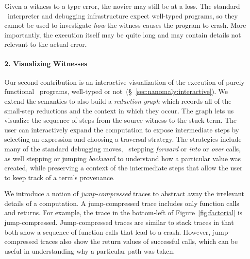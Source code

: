Given a witness to a type error, the novice may still be at a loss.
%
The standard \ocaml\ interpreter and debugging infrastructure expect
well-typed programs, so they cannot be used to investigate \emph{how}
the witness causes the program to crash.
%
More importantly, the execution itself may be quite long and may contain
details not relevant to the actual error.

\paragraph{2. Visualizing Witnesses}
Our second contribution is an interactive visualization of the
execution of purely functional \ocaml\ programs, well-typed or not~(\S~\ref{sec:nanomaly:interactive}).
%
We extend the semantics to also build a \emph{reduction graph}
which records all of the small-step reductions and the context
in which they occur.
%
The graph lets us visualize the sequence of
steps from the source witness to the stuck term. The user can
interactively expand the computation to expose intermediate steps
by selecting an expression and choosing a traversal strategy.
%
The strategies include many of the standard debugging moves, \eg\
stepping \emph{forward} or \emph{into} or \emph{over} calls, as well
stepping or jumping \emph{backward} to understand how a particular
value was created, while preserving a context of the intermediate
steps that allow the user to keep track of a term's provenance.

We introduce a notion of \emph{jump-compressed} traces to abstract away
the irrelevant details of a computation.
%
A jump-compressed trace includes only function
calls and returns. For example, the trace in the bottom-left of
Figure~\ref{fig:factorial} is jump-compressed.
%
Jump-compressed traces are similar to stack traces in that both show a
sequence of function calls that lead to a crash. However, jump-compressed
traces also show the return values of successful calls, which can be
useful in understanding why a particular path was taken.

